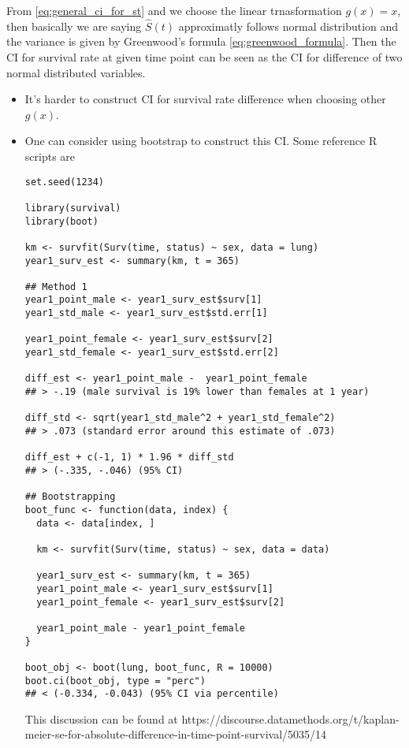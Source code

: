 \documentclass[a4paper,12pt]{article}
\begin{document}
From \eqref{eq:general_ci_for_st} and we choose the linear trnasformation $g\left(x\right) = x$, then basically we are saying $\hat{S}\left(t\right)$ approximatly follows normal distribution and the variance is given by Greenwood's formula \eqref{eq:greenwood_formula}. Then the CI for survival rate at given time point can be seen as the CI for difference of two normal distributed variables.
\begin{itemize}
\item It's harder to construct CI for survival rate difference when choosing other $g\left(x\right)$.
\item One can consider using bootstrap to construct this CI. Some reference R scripts are
\begin{verbatim}
set.seed(1234)

library(survival)
library(boot)

km <- survfit(Surv(time, status) ~ sex, data = lung)
year1_surv_est <- summary(km, t = 365)

## Method 1
year1_point_male <- year1_surv_est$surv[1]
year1_std_male <- year1_surv_est$std.err[1]

year1_point_female <- year1_surv_est$surv[2]
year1_std_female <- year1_surv_est$std.err[2]

diff_est <- year1_point_male -  year1_point_female
## > -.19 (male survival is 19% lower than females at 1 year)

diff_std <- sqrt(year1_std_male^2 + year1_std_female^2)
## > .073 (standard error around this estimate of .073)

diff_est + c(-1, 1) * 1.96 * diff_std
## > (-.335, -.046) (95% CI)

## Bootstrapping
boot_func <- function(data, index) {
  data <- data[index, ]
  
  km <- survfit(Surv(time, status) ~ sex, data = data)
  
  year1_surv_est <- summary(km, t = 365)
  year1_point_male <- year1_surv_est$surv[1]
  year1_point_female <- year1_surv_est$surv[2]
  
  year1_point_male - year1_point_female
}

boot_obj <- boot(lung, boot_func, R = 10000)
boot.ci(boot_obj, type = "perc")
## < (-0.334, -0.043) (95% CI via percentile) 
\end{verbatim}
  This discussion can be found at https://discourse.datamethods.org/t/kaplan-meier-se-for-absolute-difference-in-time-point-survival/5035/14
\end{itemize}
\end{document}
